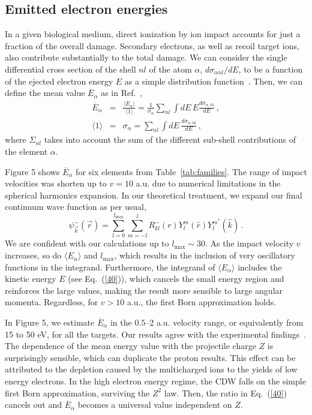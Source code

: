 \documentclass[preprint,12pt]{article}
\begin{document}
\subsection{Emitted electron energies}

In a given biological medium, direct ionization by ion impact accounts 
for just a fraction of the overall damage. Secondary electrons, as well 
as recoil target ions, also contribute substantially to the total damage. 
We can consider the single differential cross section of the shell 
$nl$ of the atom $\alpha$, $d\sigma _{\alpha nl}/dE$, to be a function 
of the ejected electron energy $E$ as a simple distribution 
function~\cite{surdutovic2018}. Then, we can define the mean value 
$\overline{E}_{\alpha}$ as in Ref.~\cite{abril2015},
\begin{eqnarray}
\overline{E}_{\alpha} &=&\frac{\langle E_{\alpha}\rangle}{\langle
1\rangle}=\frac{1}{\sigma_{\alpha}}\sum\limits_{nl}\int dE\,E
\frac{d\sigma_{\alpha,nl}}{dE}\,,  
\label{40} \\
\langle 1\rangle &=&\sigma_{\alpha}=\sum\limits_{nl}\int dE\,
\frac{d\sigma_{\alpha,nl}}{dE}\,,  
\label{50}
\end{eqnarray}
where $\Sigma_{nl}$ takes into account the sum of the different 
sub-shell contributions of the element $\alpha$.

Figure 5 shows $\overline{E}_{\alpha}$ for six elements from 
Table~\ref{tab:families}. The range of impact velocities was shorten up 
to $v=10$ a.u. due to numerical limitations in the spherical harmonics 
expansion. In our theoretical treatment, we expand our final continuum 
wave function as per usual,
\begin{equation}
\psi_{\overrightarrow{k}}^{-}(\overrightarrow{r})=\sum_{l=0}^{l_{\max
}}\sum_{m=-l}^{l}R_{kl}^{-}(r)Y_{l}^{m}(\widehat{r})Y_{l}^{m^{\ast }}
(\widehat{k})\,.
\label{60}
\end{equation}
We are confident with our calculations up to $l_{\max}\sim 30$. 
As the impact velocity $v$ increases, so do $\langle E_{\alpha}\rangle$
and $l_{\max}$, which results in the inclusion of very oscillatory 
functions in the integrand. Furthermore, the integrand of
$\langle E_{\alpha}\rangle$ includes the kinetic energy $E$
(see Eq.~(\ref{40})), which cancels the small energy region and 
reinforces the large values, making the result more sensible to large
angular momenta. Regardless, for $v>10$ a.u., the first Born 
approximation holds.

In Figure 5, we estimate $\overline{E}_{\alpha}$ in the 0.5--2 a.u.
velocity range, or equivalently from 15 to 50 eV, for all the targets.
Our results agree with the experimental findings~\cite{surdutovic2018}. 
The dependence of the mean energy value with the projectile charge $Z$ 
is surprisingly sensible, which can duplicate the proton results. 
This effect can be attributed to the depletion caused by the 
multicharged ions to the yields of low energy electrons. In the high 
electron energy regime, the CDW falls on the simple first Born 
approximation, surviving the $Z^{2}$ law. Then, the ratio in 
Eq.~(\ref{40}) cancels out and $\overline{E}_{\alpha}$ becomes a 
universal value independent on $Z$.
\end{document}

